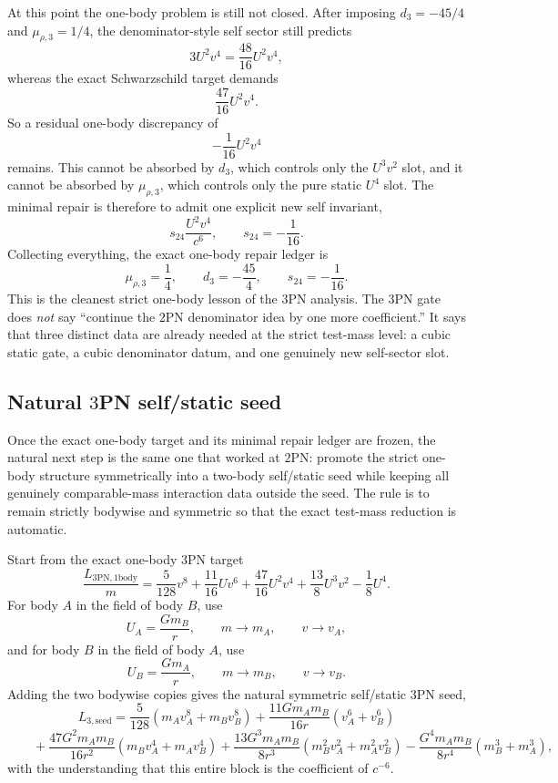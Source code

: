 \documentclass[11pt]{article}
\begin{document}
At this point the one-body problem is still not closed.  After imposing
\(d_3=-45/4\) and \(\mu_{\rho,3}=1/4\), the denominator-style self sector still
predicts
\[
3U^2v^4=\frac{48}{16}U^2v^4,
\]
whereas the exact Schwarzschild target demands
\[
\frac{47}{16}U^2v^4.
\]
So a residual one-body discrepancy of
\[
-\frac1{16}U^2v^4
\]
remains.  This cannot be absorbed by $d_3$, which controls only the $U^3v^2$
slot, and it cannot be absorbed by $\mu_{\rho,3}$, which controls only the pure
static $U^4$ slot.  The minimal repair is therefore to admit one explicit new
self invariant,
\[
s_{24}\frac{U^2v^4}{c^6},
\qquad
\boxed{s_{24}=-\frac1{16}.}
\]
Collecting everything, the exact one-body repair ledger is
\[
\boxed{
\mu_{\rho,3}=\frac14,
\qquad
 d_3=-\frac{45}{4},
\qquad
 s_{24}=-\frac1{16}.
}
\]
This is the cleanest strict one-body lesson of the $3$PN analysis.  The $3$PN
gate does \emph{not} say ``continue the $2$PN denominator idea by one more
coefficient.''  It says that three distinct data are already needed at the
strict test-mass level: a cubic static gate, a cubic denominator datum, and one
genuinely new self-sector slot.

\subsection{Natural \texorpdfstring{$3$}{3}PN self/static seed}
\label{sec:onebody-seed}

Once the exact one-body target and its minimal repair ledger are frozen, the
natural next step is the same one that worked at $2$PN: promote the strict
one-body structure symmetrically into a two-body self/static seed while keeping
all genuinely comparable-mass interaction data outside the seed.  The rule is to
remain strictly bodywise and symmetric so that the exact test-mass reduction is
automatic.

Start from the exact one-body $3$PN target
\[
\frac{L_{3\mathrm{PN},1\mathrm{body}}}{m}
=
\frac5{128}v^8
+\frac{11}{16}Uv^6
+\frac{47}{16}U^2v^4
+\frac{13}{8}U^3v^2
-\frac18U^4.
\]
For body $A$ in the field of body $B$, use
\[
U_A=\frac{Gm_B}{r},
\qquad
m\to m_A,
\qquad
v\to v_A,
\]
and for body $B$ in the field of body $A$, use
\[
U_B=\frac{Gm_A}{r},
\qquad
m\to m_B,
\qquad
v\to v_B.
\]
Adding the two bodywise copies gives the natural symmetric self/static $3$PN
seed,
\[
\boxed{
L_{3,\mathrm{seed}}
=
\frac{5}{128}(m_Av_A^8+m_Bv_B^8)
+\frac{11Gm_A m_B}{16r}(v_A^6+v_B^6)
}
\]
\[
\boxed{
\qquad
+\frac{47G^2m_A m_B}{16r^2}(m_Bv_A^4+m_Av_B^4)
+\frac{13G^3m_A m_B}{8r^3}(m_B^2v_A^2+m_A^2v_B^2)
-\frac{G^4m_A m_B}{8r^4}(m_B^3+m_A^3),
}
\]
with the understanding that this entire block is the coefficient of $c^{-6}$.
\end{document}
